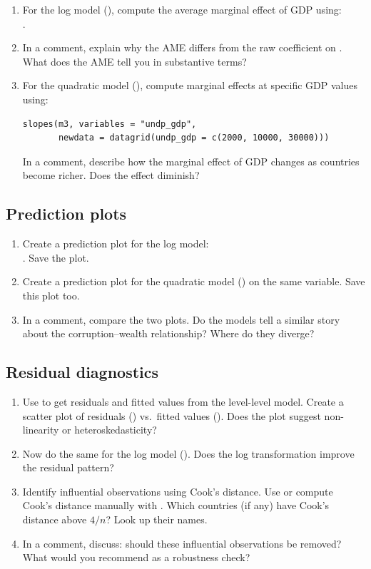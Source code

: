 \begin{enumerate}[label=\alph*)]
  \item For the log model (), compute the average marginal effect of GDP using: \\.
  \item In a comment, explain why the AME differs from the raw coefficient on . What does the AME tell you in substantive terms?
  \item For the quadratic model (), compute marginal effects at specific GDP values using:
  \begin{lstlisting}
slopes(m3, variables = "undp_gdp",
       newdata = datagrid(undp_gdp = c(2000, 10000, 30000)))
  \end{lstlisting}
  In a comment, describe how the marginal effect of GDP changes as countries become richer. Does the effect diminish?
\end{enumerate}

\subsection{Prediction plots}

\begin{enumerate}[label=\alph*)]
  \item Create a prediction plot for the log model: \\. Save the plot.
  \item Create a prediction plot for the quadratic model () on the same variable. Save this plot too.
  \item In a comment, compare the two plots. Do the models tell a similar story about the corruption--wealth relationship? Where do they diverge?
\end{enumerate}

\subsection{Residual diagnostics}

\begin{enumerate}[label=\alph*)]
  \item Use  to get residuals and fitted values from the level-level model. Create a scatter plot of residuals () vs.\ fitted values (). Does the plot suggest non-linearity or heteroskedasticity?
  \item Now do the same for the log model (). Does the log transformation improve the residual pattern?
  \item Identify influential observations using Cook's distance. Use  or compute Cook's distance manually with . Which countries (if any) have Cook's distance above $4/n$? Look up their names.
  \item In a comment, discuss: should these influential observations be removed? What would you recommend as a robustness check?
\end{enumerate}

